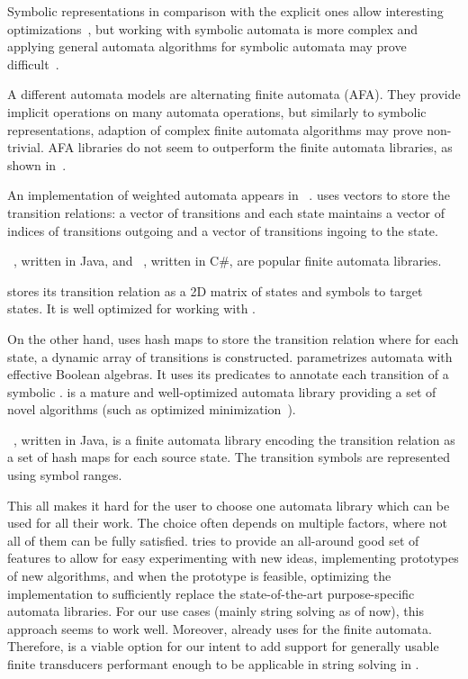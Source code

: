 Symbolic representations in comparison with the explicit ones allow interesting optimizations~\cite{dantoni_taminimization_2016}, but working with symbolic automata is more complex and applying general automata algorithms for symbolic automata may prove difficult~\cite{dantoni_taminimization_2016, symbsim18}.

A different automata models are alternating finite automata (AFA).
They provide implicit operations on many automata operations, but similarly to symbolic representations, adaption of complex finite automata algorithms may prove non-trivial.
AFA libraries do not seem to outperform the finite automata libraries, as shown in~\cite{cade23_reasoning_regular_properties_comparision_DBLP:conf/cade/FiedorHHRSV23}.

An implementation of weighted automata appears in \awali~\cite{Awali}.
\awali uses vectors to store the transition relations: a vector of transitions and each state maintains a vector of indices of transitions outgoing and a vector of transitions ingoing to the state.

\automatajar~\cite{automatajar}, written in Java, and \automatanet~\cite{automatanet}, written in C\#, are popular finite automata libraries.

\automatajar stores its transition relation as a 2D matrix of states and symbols to target states.
It is well optimized for working with \dfas.

On the other hand, \automatanet uses hash maps to store the transition relation where for each state, a dynamic array of transitions is constructed.
\automatanet parametrizes automata with effective Boolean algebras.
It uses its predicates to annotate each transition of a symbolic \nfa.
\automatanet is a mature and well-optimized automata library providing a set of novel algorithms (such as optimized minimization~\cite{margus_minimization}).

\brics~\cite{brics}, written in Java, is a finite automata library encoding the transition relation as a set of hash maps for each source state.
The transition symbols are represented using symbol ranges.

This all makes it hard for the user to choose one automata library which can be used for all their work.
The choice often depends on multiple factors, where not all of them can be fully satisfied.
\mata tries to provide an all-around good set of features to allow for easy experimenting with new ideas, implementing prototypes of new algorithms, and when the prototype is feasible, optimizing the implementation to sufficiently replace the state-of-the-art purpose-specific automata libraries.
For our use cases (mainly string solving as of now), this approach seems to work well.
Moreover, \noodler already uses \mata for the finite automata.
Therefore, \mata is a viable option for our intent to add support for generally usable finite transducers performant enough to be applicable in string solving in \noodler.

